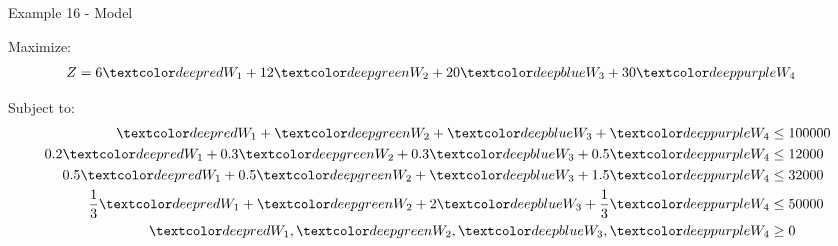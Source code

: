 \begin{frame}{Example 16 - Model}

Maximize:
\begin{align*}
    Z &= 6\colora{W_1} + 12\colorb{W_2} + 20\colorc{W_3} + 30\colord{W_4}
\end{align*}

Subject to:
\begin{align*}
       \colora{W_1} +    \colorb{W_2} +    \colorc{W_3} +    \colord{W_4} &\le 100000 \\
    0.2\colora{W_1} + 0.3\colorb{W_2} + 0.3\colorc{W_3} + 0.5\colord{W_4} &\le 12000 \\
    0.5\colora{W_1} + 0.5\colorb{W_2} +    \colorc{W_3} + 1.5\colord{W_4} &\le 32000 \\
    \frac{1}{3}\colora{W_1} + \colorb{W_2} + 2\colorc{W_3} + \frac{1}{3}\colord{W_4} &\le 50000 \\
    \colora{W_1}, \colorb{W_2}, \colorc{W_3}, \colord{W_4} &\ge 0
\end{align*}

\end{frame}
